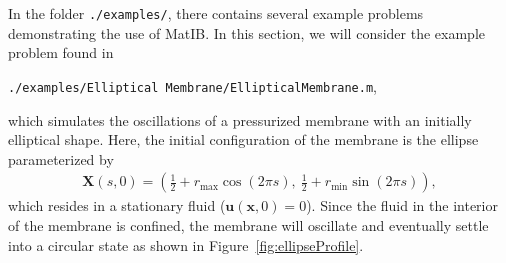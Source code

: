 \documentclass{article}
\newcommand{\mycode}[1]{\texttt{#1}}
\newcommand{\bs}[1]{\boldsymbol{#1}}
\newcommand{\half}{\frac{1}{2}}
\begin{document}
In the folder \mycode{./examples/}, there contains several example problems demonstrating the use of MatIB.
In this section, we will consider the example problem found in
\begin{center}
\mycode{./examples/Elliptical Membrane/EllipticalMembrane.m}, 
\end{center}
which simulates the oscillations of a pressurized membrane with an
initially elliptical shape.
Here, the initial configuration of the membrane is the
ellipse parameterized by
\begin{gather*}
  \bs{X}(s,0) = \left( \half + r_{\text{max}} \cos(2 \pi s) ,~
    \half + r_{\text{min}}  \sin(2 \pi s) \right),
\end{gather*}
which resides in a stationary fluid ($\bs{u}(\bs{x},0)=0$). 
Since the fluid in the interior of the membrane is confined, 
the membrane will oscillate and eventually settle into a circular state
as shown in Figure~\ref{fig:ellipseProfile}.
\end{document}
